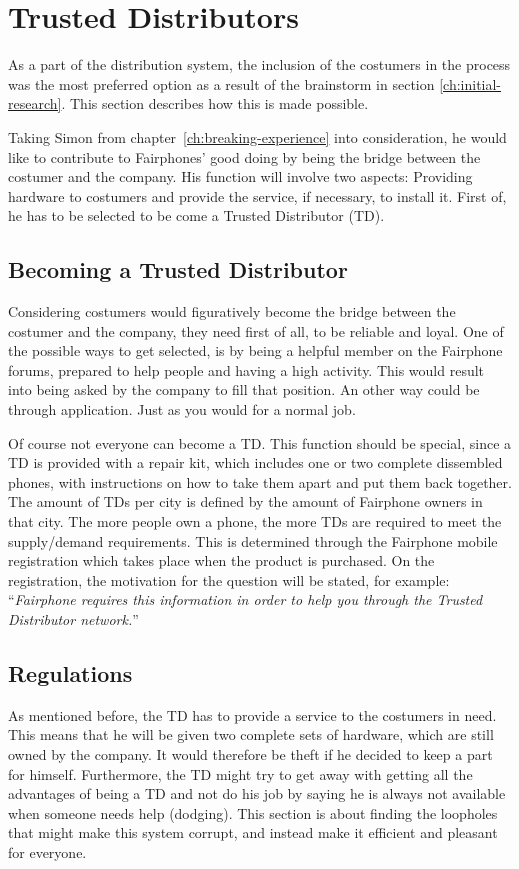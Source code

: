 \documentclass[final]{scrreprt} %
\begin{document}
\chapter{Trusted Distributors} %
\label{ch:trusted-distributors}
As a part of the distribution system, the inclusion of the costumers in the process was the most preferred option as a result of the brainstorm in section \ref{ch:initial-research}. This section describes how this is made possible.

Taking Simon from chapter~\ref{ch:breaking-experience} into consideration, he would like to contribute to Fairphones' good doing by being the bridge between the costumer and the company. His function will involve two aspects: Providing hardware to costumers and provide the service, if necessary, to install it. First of, he has to be selected to be come a Trusted Distributor (TD).

\section{Becoming a Trusted Distributor}
Considering costumers would figuratively become the bridge between the costumer and the company, they need first of all, to be reliable and loyal. One of the possible ways to get selected, is by being a helpful member on the Fairphone forums, prepared to help people and having a high activity. This would result into being asked by the company to fill that position. An other way could be through application. Just as you would for a normal job. 

Of course not everyone can become a TD. This function should be special, since a TD is provided with a repair kit, which includes one or two complete dissembled phones, with instructions on how to take them apart and put them back together. The amount of TDs per city is defined by the amount of Fairphone owners in that city. The more people own a phone, the more TDs are required to meet the supply/demand requirements. This is determined through the Fairphone mobile registration which takes place when the product is purchased. On the registration, the motivation for the question will be stated, for example: ``\textit{Fairphone requires this information in order to help you through the Trusted Distributor network.}''  

\section{Regulations}\label{sec:regulations}
As mentioned before, the TD has to provide a service to the costumers in need. This means that he will be given two complete sets of hardware, which are still owned by the company. It would therefore be theft if he decided to keep a part for himself. Furthermore, the TD might try to get away with getting all the advantages of being a TD and not do his job by saying he is always not available when someone needs help (dodging). This section is about finding the loopholes that might make this system corrupt, and instead make it efficient and pleasant for everyone.
\end{document}
